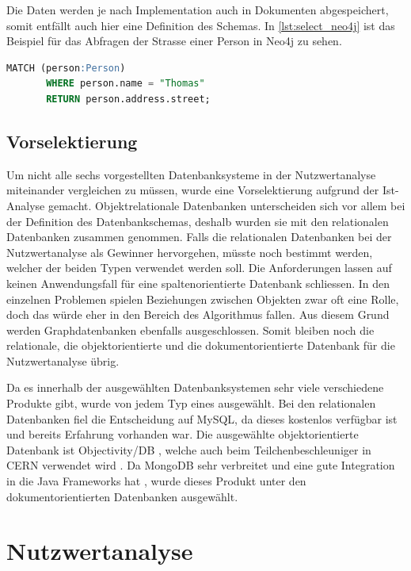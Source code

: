 Die Daten werden je nach Implementation auch in Dokumenten abgespeichert, somit entfällt auch hier eine Definition des Schemas. In \autoref{lst:select_neo4j} ist das Beispiel 
für das Abfragen der Strasse einer Person in Neo4j zu sehen.

\begin{lstlisting}[language=SQL, caption=Abfrage in Neo4j, label=lst:select_neo4j]  
       MATCH (person:Person)
       WHERE person.name = "Thomas"
       RETURN person.address.street;
\end{lstlisting}

\subsection{Vorselektierung}\label{preselection}
Um nicht alle sechs vorgestellten Datenbanksysteme in der Nutzwertanalyse miteinander vergleichen zu müssen, wurde eine Vorselektierung aufgrund der Ist-Analyse gemacht. 
Objektrelationale Datenbanken unterscheiden sich vor allem bei der Definition des Datenbankschemas, deshalb wurden sie mit den relationalen Datenbanken zusammen genommen. Falls die 
relationalen Datenbanken bei der Nutzwertanalyse als Gewinner hervorgehen, müsste noch bestimmt werden, welcher der beiden Typen verwendet werden soll. Die Anforderungen lassen auf 
keinen Anwendungsfall für eine spaltenorientierte Datenbank schliessen. In den einzelnen Problemen spielen Beziehungen zwischen Objekten zwar oft eine Rolle, doch das würde eher in den 
Bereich des Algorithmus fallen. Aus diesem Grund werden Graphdatenbanken ebenfalls ausgeschlossen. Somit bleiben noch die relationale, die objektorientierte und die dokumentorientierte 
Datenbank für die Nutzwertanalyse übrig.

Da es innerhalb der ausgewählten Datenbanksystemen sehr viele verschiedene Produkte gibt, wurde von jedem Typ eines ausgewählt. Bei den relationalen Datenbanken fiel die 
Entscheidung auf MySQL\cite{mysql}, da dieses kostenlos verfügbar ist und bereits Erfahrung vorhanden war. Die ausgewählte objektorientierte Datenbank ist Objectivity/DB \cite{objectivitydb}, 
welche auch beim Teilchenbeschleuniger in CERN verwendet wird \cite{cern_objectivity}. Da MongoDB \cite{mongodb} sehr verbreitet und eine gute Integration in die Java Frameworks hat 
\cite{spring_data_mongodb} \cite{hibernate_mongodb}, wurde dieses Produkt unter den dokumentorientierten Datenbanken ausgewählt.

\newpage
\section{Nutzwertanalyse}\label{architektur_nutzwertanalyse}

